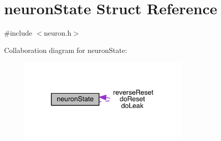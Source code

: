\hypertarget{structneuron_state}{}\section{neuron\+State Struct Reference}
\label{structneuron_state}


{\ttfamily \#include $<$neuron.\+h$>$}



Collaboration diagram for neuron\+State\+:
\nopagebreak
\begin{figure}[H]
\begin{center}
\leavevmode
\includegraphics[width=231pt]{structneuron_state__coll__graph}
\end{center}
\end{figure}

